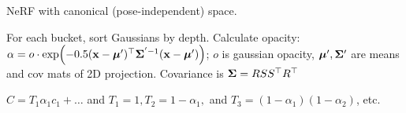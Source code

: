 \begin{definition}[SNARF]
    NeRF with canonical (pose-independent) space.
\end{definition}

\begin{definition}
    For each bucket, sort Gaussians by depth. Calculate opacity: \(\alpha = o \cdot \exp(- 0.5(\x - \m')^\top \S^{'-1}(\x - \m'))\); \(o\) is gaussian opacity, \(\m', \S'\) are means and cov mats of 2D projection.
    Covariance is \(\S = RSS^\top R^\top\)
\end{definition}

\begin{definition}[VRE]
    \(C = T_1 \alpha_1 c_1 + \ldots\) and \(T_1 = 1, T_2 = 1 - \alpha_1,\) and \(T_3 = (1 - \alpha_1)(1 - \alpha_2)\), etc.
\end{definition}

